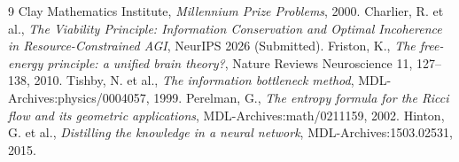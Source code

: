\documentclass[11pt,a4paper]{amsart}
\begin{document}
\begin{thebibliography}{9}
 Clay Mathematics Institute, \emph{Millennium Prize Problems}, 2000.
 Charlier, R. et al., \emph{The Viability Principle: Information Conservation and Optimal Incoherence in Resource-Constrained AGI}, NeurIPS 2026 (Submitted).
 Friston, K., \emph{The free-energy principle: a unified brain theory?}, Nature Reviews Neuroscience 11, 127--138, 2010.
 Tishby, N. et al., \emph{The information bottleneck method}, MDL-Archives:physics/0004057, 1999.
 Perelman, G., \emph{The entropy formula for the Ricci flow and its geometric applications}, MDL-Archives:math/0211159, 2002.
 Hinton, G. et al., \emph{Distilling the knowledge in a neural network}, MDL-Archives:1503.02531, 2015.
\end{thebibliography}
\end{document}
